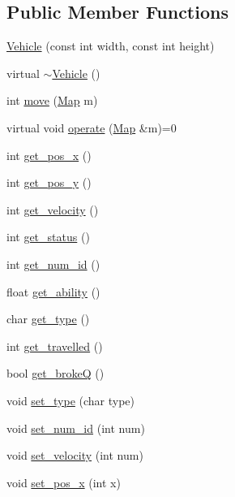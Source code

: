 \subsection*{Public Member Functions}
\begin{DoxyCompactItemize}
\item 
\hyperlink{class_vehicle_aef579c9dd3b44a77ceb3addd4fefc47b}{Vehicle} (const int width, const int height)
\item 
virtual \hyperlink{class_vehicle_a61ab140c755b8e0e824d54117cf4546f}{$\sim$\-Vehicle} ()
\item 
int \hyperlink{class_vehicle_a7e287f67c54968a70d46ce63a94e9c63}{move} (\hyperlink{class_map}{Map} m)
\item 
virtual void \hyperlink{class_vehicle_a6a0ed71ee9d4c569ee26961b213775db}{operate} (\hyperlink{class_map}{Map} \&m)=0
\item 
int \hyperlink{class_vehicle_a9528f57214d74276572e7b3858715b40}{get\-\_\-pos\-\_\-x} ()
\item 
int \hyperlink{class_vehicle_af1ffe0bf89d9cdc3f55033d73d8fb283}{get\-\_\-pos\-\_\-y} ()
\item 
int \hyperlink{class_vehicle_aa133cd93822aad408c811f89a3a0b273}{get\-\_\-velocity} ()
\item 
int \hyperlink{class_vehicle_a035e04c7cb7a2976b50f816af49dfa9d}{get\-\_\-status} ()
\item 
int \hyperlink{class_vehicle_a8b95156ffce6a2defece8cdda3405449}{get\-\_\-num\-\_\-id} ()
\item 
float \hyperlink{class_vehicle_a2ca803306acbd7f5876f6a22023470c2}{get\-\_\-ability} ()
\item 
char \hyperlink{class_vehicle_a3957f26debbf0726bf983d70ebd9b334}{get\-\_\-type} ()
\item 
int \hyperlink{class_vehicle_a44cdd7a765e0ecc93cd88c4449c7ff2a}{get\-\_\-travelled} ()
\item 
bool \hyperlink{class_vehicle_ada86b9d1054e3841d3fb0d5433e11774}{get\-\_\-broke\-Q} ()
\item 
void \hyperlink{class_vehicle_a933de97259d52a073e167cb4902cf272}{set\-\_\-type} (char type)
\item 
void \hyperlink{class_vehicle_a33fa7c0df43c6f1de03339745ba226e7}{set\-\_\-num\-\_\-id} (int num)
\item 
void \hyperlink{class_vehicle_abebe961f59c383b6ae23c1eb9a011519}{set\-\_\-velocity} (int num)
\item 
void \hyperlink{class_vehicle_a5295b6b7ebd67c074896604d06f30b53}{set\-\_\-pos\-\_\-x} (int x)

\end{DoxyCompactItemize}
